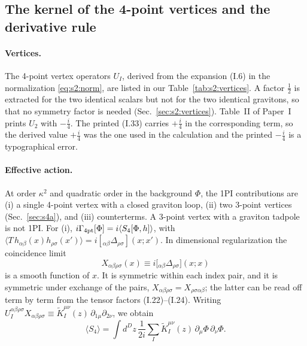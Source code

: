 \documentclass[aps,prd,onecolumn,10pt,nofootinbib,floatfix]{revtex4-2}
\newcommand{\PI}{Paper~I}
\newcommand{\eqI}[1]{(I.#1)}
\begin{document}
\subsection{The kernel of the 4-point vertices and the derivative rule}
\label{sec:s3:rule}

\paragraph*{Vertices.}
The 4-point vertex operators $U_I$, derived from the expansion \eqI{6} in the normalization
\eqref{eq:s2:norm}, are listed in our Table~\ref{tab:s2:vertices}. A factor $\frac12$ is extracted for the
two identical scalars but not for the two identical gravitons, so that no symmetry factor is needed
(Sec.~\ref{sec:s2:vertices}). Table~II of \PI{} prints $U_2$ with $-\frac i4$. The printed \eqI{33}
carries $+\frac i4$ in the corresponding term, so the derived value $+\frac i4$ was the one used in the
calculation and the printed $-\frac i4$ is a typographical error.

\paragraph*{Effective action.}
At order $\kappa^2$ and quadratic order in the background $\Phi$, the 1PI contributions are
(i) a single 4-point vertex with a closed graviton loop, (ii) two 3-point vertices
(Sec.~\ref{sec:s4a}), and (iii) counterterms. A 3-point vertex with a graviton tadpole is not 1PI. For (i),
$i\Gamma_{\rm 4pt}[\Phi]=i\langle S_4[\Phi,h]\rangle$, with
$\langle T\,h_{\alpha\beta}(x)h_{\rho\sigma}(x')\rangle=i[{}_{\alpha\beta}\Delta_{\rho\sigma}](x;x')$.
In dimensional regularization the coincidence limit
\begin{equation}\label{eq:s3:X}
X_{\alpha\beta\rho\sigma}(x)\equiv i\bigl[{}_{\alpha\beta}\Delta_{\rho\sigma}\bigr](x;x)
\end{equation}
is a smooth function of $x$. It is symmetric within each index pair, and it is symmetric under
exchange of the pairs, $X_{\alpha\beta\rho\sigma}=X_{\rho\sigma\alpha\beta}$; the latter can
be read off term by term from the tensor factors \eqI{22}--\eqI{24}. Writing
$U_I^{\alpha\beta\rho\sigma}X_{\alpha\beta\rho\sigma}\equiv\tilde K_I^{\mu\nu}(z)\,\partial_{1\mu}\partial_{2\nu}$,
we obtain
\begin{equation}\label{eq:s3:S4}
\langle S_4\rangle=\int d^Dz\,\frac1{2i}\sum_I\tilde K_I^{\mu\nu}(z)\,\partial_\mu\Phi\,\partial_\nu\Phi .
\end{equation}
\end{document}
